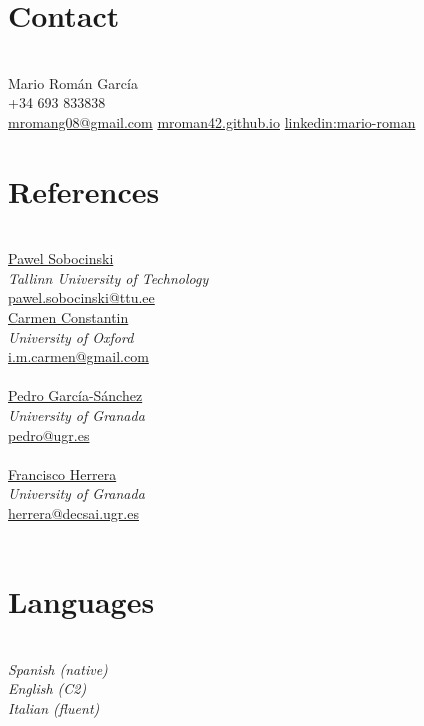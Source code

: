 \documentclass[nocolors]{friggeri-cv-a4}
\begin{document}

\begin{aside} %
  \section{Contact}\\
  Mario Román García\\
+34 693 833838\\
\href{mailto:mromang08@gmail.com}{mromang08@gmail.com}
\href{https://mroman42.github.io}{mroman42.github.io}
\href{https://www.linkedin.com/in/mario-roman}{linkedin:mario-roman}
\section{References}\\
\href{}{Pawel Sobocinski}\\
\textit{Tallinn University of Technology}\\
\href{mailto:pawel.sobocinski@ttu.ee}{pawel.sobocinski@ttu.ee }\\
\quad
\href{https://www.mansfield.ox.ac.uk/dr-carmen-constantin}{Carmen Constantin}\\
\textit{University of Oxford}\\
\href{mailto:i.m.carmen@gmail.com}{i.m.carmen@gmail.com}\\
\quad\\
\href{https://scholar.google.com/citations?user=gvq9UmMAAAAJ&hl=en&oi=ao}{Pedro García-Sánchez}\\
\textit{University of Granada}\\
\href{mailto:pedro@ugr.es}{pedro@ugr.es}\\
\quad\\
\href{https://scholar.google.com/citations?user=HULIk-QAAAAJ&hl=en&oi=sra}{Francisco Herrera}\\
\textit{University of Granada}\\
\href{mailto:herrera@decsai.ugr.es}{herrera@decsai.ugr.es}\\
\quad\\



\section{Languages}\\
\textit{Spanish (native)\\
English (C2) \\
Italian (fluent)}

\end{aside}
\end{document}

